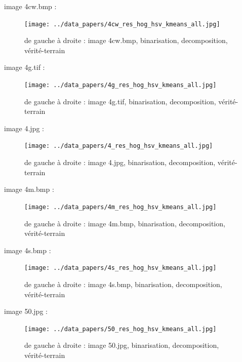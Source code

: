 \documentclass{book}
\begin{document}
image 4cw.bmp : 
\begin{figure}[H]
\begin{center}
\texttt{[image: ../data\_papers/4cw\_res\_hog\_hsv\_kmeans\_all.jpg]}
\end{center}
\caption{de gauche à droite : image 4cw.bmp, binarisation, decomposition, vérité-terrain}
\label{4cw}
\end{figure}
\clearpage


image 4g.tif : 
\begin{figure}[H]
\begin{center}
\texttt{[image: ../data\_papers/4g\_res\_hog\_hsv\_kmeans\_all.jpg]}
\end{center}
\caption{de gauche à droite : image 4g.tif, binarisation, decomposition, vérité-terrain}
\label{4g}
\end{figure}
\clearpage


image 4.jpg : 
\begin{figure}[H]
\begin{center}
\texttt{[image: ../data\_papers/4\_res\_hog\_hsv\_kmeans\_all.jpg]}
\end{center}
\caption{de gauche à droite : image 4.jpg, binarisation, decomposition, vérité-terrain}
\label{4}
\end{figure}
\clearpage


image 4m.bmp : 
\begin{figure}[H]
\begin{center}
\texttt{[image: ../data\_papers/4m\_res\_hog\_hsv\_kmeans\_all.jpg]}
\end{center}
\caption{de gauche à droite : image 4m.bmp, binarisation, decomposition, vérité-terrain}
\label{4m}
\end{figure}
\clearpage


image 4s.bmp : 
\begin{figure}[H]
\begin{center}
\texttt{[image: ../data\_papers/4s\_res\_hog\_hsv\_kmeans\_all.jpg]}
\end{center}
\caption{de gauche à droite : image 4s.bmp, binarisation, decomposition, vérité-terrain}
\label{4s}
\end{figure}
\clearpage


image 50.jpg : 
\begin{figure}[H]
\begin{center}
\texttt{[image: ../data\_papers/50\_res\_hog\_hsv\_kmeans\_all.jpg]}
\end{center}
\caption{de gauche à droite : image 50.jpg, binarisation, decomposition, vérité-terrain}
\label{50}
\end{figure}
\clearpage
\end{document}
